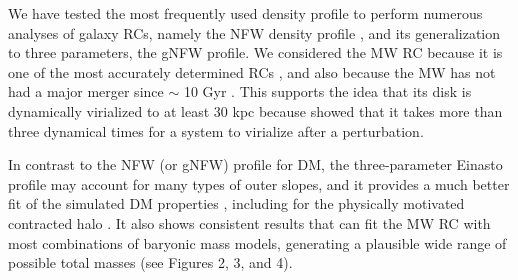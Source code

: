 \documentclass{aa}
\begin{document}
We have tested the most frequently used density profile to perform numerous analyses of galaxy RCs, namely the NFW density profile \citep{Navarro1997}, and its generalization to three parameters, the gNFW profile. We considered the MW RC because it is one of the most accurately determined RCs \citep{Eilers2019}, and also because the MW has not had a major merger since $\sim$ 10 Gyr \citep{Hammer2007,Helmi2020}. This supports the idea that its disk is dynamically virialized to at least 30 kpc because \citet{Gnedin1999} showed that it takes more than three dynamical times for a system to virialize after a perturbation. %

In contrast to the NFW (or gNFW) profile for DM, the three-parameter Einasto profile \citep[see also \citealt{Retana-Montenegro2012}]{Einasto1965} may account for many types of outer slopes, and it provides a much better fit of the simulated DM properties \citep[and references therein]{Dutton2014}, including for the physically motivated contracted halo \citep{Cautun2020}. It also shows consistent results that can fit the MW RC with most combinations of baryonic mass models, generating a plausible wide range of possible total masses (see Figures  2, 3, and 4). 
\end{document}
